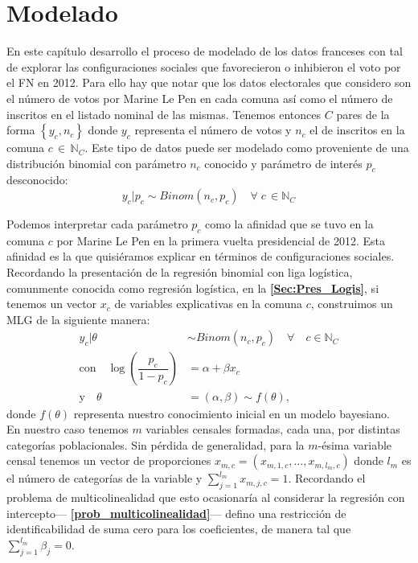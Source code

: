 \chapter{Modelado}

En este capítulo desarrollo el proceso de modelado de los datos franceses con tal de explorar las configuraciones sociales que favorecieron o inhibieron el voto por el FN en 2012. Para ello hay que notar que los datos electorales que considero son el número de votos por Marine Le Pen en cada comuna así como el número de inscritos en el listado nominal de las mismas. Tenemos entonces $C$ pares de la forma $\left\lbrace y_c, n_c \right\rbrace$ donde $y_c$ representa el número de votos y $n_c$ el de inscritos en la comuna $c \,\in\,\mathbb{N}_C$. Este tipo de datos puede ser modelado como proveniente de una distribución binomial con parámetro $n_c$ conocido y parámetro de interés $p_c$ desconocido: 
\begin{equation*}
y_c|p_c \sim Binom(n_c, p_c) \quad \forall \; c \, \in \mathbb{N}_C
\end{equation*} 

Podemos interpretar cada parámetro $p_c$ como la afinidad que se tuvo en la comuna $c$ por Marine Le Pen en la primera vuelta presidencial de 2012. Esta afinidad es la que quisiéramos explicar en términos de configuraciones sociales.\\

Recordando la presentación de la regresión binomial con liga logística, comunmente conocida como regresión logística, en la \textbf{\autoref{Sec:Pres_Logis}}, si tenemos un vector $x_c$ de variables explicativas en la comuna $c$, construimos un MLG de la siguiente manera: 
\begin{align*}
y_c|\theta & \sim Binom(n_c,p_c) \quad \forall \quad c \in \mathbb{N}_C \\
\text{con} \quad \log\left(\dfrac{p_c}{1-p_c}\right) &= \alpha + \beta x_c \nonumber \\
\text{y} \quad \theta &= (\alpha,\beta) \sim f(\theta),
\end{align*}
donde $f(\theta)$ representa nuestro conocimiento inicial en un modelo bayesiano.\\ 

En nuestro caso tenemos $m$ variables censales formadas, cada una, por distintas categorías poblacionales. Sin pérdida de generalidad, para la $m$-ésima variable censal tenemos un vector de proporciones $x_{m,c}=(x_{m,1,c},\dots,x_{m,l_m,c})$ donde $l_m$ es el número de categorías de la variable y $\sum\limits_{j=1}^{l_m} x_{m,j,c}=1$. Recordando el problema de multicolinealidad que esto ocasionaría al considerar la regresión con intercepto--- \textbf{\autoref{prob_multicolinealidad}}--- defino una restricción de identificabilidad de suma cero para los coeficientes, de manera tal que $\sum\limits_{j=1}^{l_m}\beta_j=0$.\\

